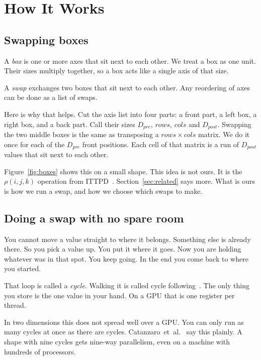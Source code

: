 \section{How It Works}
\label{sec:method}

\subsection{Swapping boxes}
\label{sec:boxes}

A \emph{box} is one or more axes that sit next to each other. We treat a box as
one unit. Their sizes multiply together, so a box acts like a single axis of
that size.

A \emph{swap} exchanges two boxes that sit next to each other. Any reordering
of axes can be done as a list of swaps.

Here is why that helps. Cut the axis list into four parts: a front part, a left
box, a right box, and a back part. Call their sizes $D_{pre}$,
$\mathit{rows}$, $\mathit{cols}$ and $D_{post}$. Swapping the two middle boxes
is the same as transposing a $\mathit{rows} \times \mathit{cols}$ matrix. We do
it once for each of the $D_{pre}$ front positions. Each cell of that matrix is
a run of $D_{post}$ values that sit next to each other.



Figure~\ref{fig:boxes} shows this on a small shape. This idea is not ours. It
is the $\rho(i,j,k)$ operation from
ITTPD~\cite{cheng2025ittpd}. Section~\ref{sec:related} says more. What is ours
is how we run a swap, and how we choose which swaps to make.

\subsection{Doing a swap with no spare room}

You cannot move a value straight to where it belongs. Something else is already
there. So you pick a value up. You put it where it goes. Now you are holding
whatever was in that spot. You keep going. In the end you come back to where
you started.

That loop is called a \emph{cycle}. Walking it is called cycle
following~\cite{gustavson2012cycleleader,dummit2003abstract}. The only thing
you store is the one value in your hand. On a GPU that is one register per
thread.

In two dimensions this does not spread well over a GPU. You can only run as
many cycles at once as there are cycles.
Catanzaro~et~al.~\cite{catanzaro2014decomposition} say this plainly. A shape
with nine cycles gets nine-way parallelism, even on a machine with hundreds of
processors.

